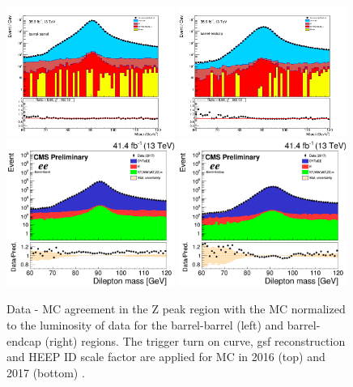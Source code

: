\begin{figure}[bh]
\begin{center}
\includegraphics[angle=0,width=0.49\textwidth]{figures/Zprime/2016/zPeakDY/hratio_M_ee2__barrel-barrel.png}
\includegraphics[angle=0,width=0.49\textwidth]{figures/Zprime/2016/zPeakDY/hratio_M_ee2__barrel-endcap.png}
\includegraphics[angle=0,width=0.49\textwidth]{figures/Zprime/2017/zPeakDY/BB_hratio_M_ee.png}
\includegraphics[angle=0,width=0.49\textwidth]{figures/Zprime/2017/zPeakDY/BE_hratio_M_ee.png}
\end{center}
\caption{Data - MC agreement in the Z peak region with the MC normalized to the luminosity of data for the barrel-barrel (left) and barrel-endcap (right) regions. The trigger turn on curve, gsf reconstruction and HEEP ID scale factor are applied for MC in 2016 (top) \cite{CMS-AN-2016-404} and 2017 (bottom) \cite{CMS-AN-2018-021}.}
\label{fig:Zpeak}
\end{figure}

